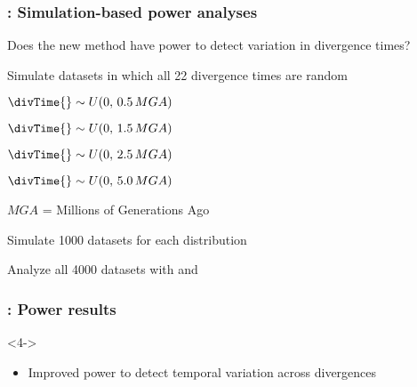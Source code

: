 \begin{frame}
    \frametitle{\dppmsbayes: Simulation-based power analyses}
    Does the new method have power to detect variation in divergence times?\\

    \bigskip
    \begin{myitemize}
        \item<2-> Simulate datasets in which all 22 divergence times are random
            \smallskip
            \begin{myitemize}
                \item $\divTime{} \sim U(0, \,0.5 \,MGA)$
                \smallskip
                \item $\divTime{} \sim U(0, \,1.5 \,MGA)$
                \smallskip
                \item $\divTime{} \sim U(0, \,2.5 \,MGA)$
                \smallskip
                \item $\divTime{} \sim U(0, \,5.0 \,MGA)$
                \smallskip
            \end{myitemize}
        \item<2-> $MGA$ = Millions of Generations Ago

        \item<3-> Simulate 1000 datasets for each \divTime{} distribution
        \item<3-> Analyze all 4000 datasets with \msb and \dppmsbayes
    \end{myitemize}
\end{frame}

\begin{frame}[t]
    \frametitle{\dppmsbayes: Power results}


    \begin{uncoverenv}<4->
    \begin{itemize}
        \item Improved power to detect temporal variation across divergences
    \end{itemize}
    \end{uncoverenv}
\end{frame}

